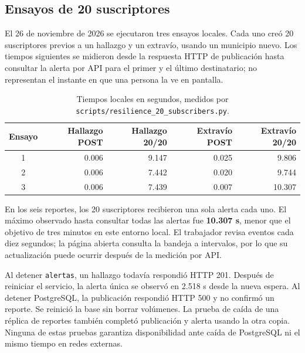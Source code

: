 \subsection*{Ensayos de 20 suscriptores}
El 26 de noviembre de 2026 se ejecutaron tres ensayos locales. Cada uno creó 20 suscriptores previos a un hallazgo y un extravío, usando un municipio nuevo. Los tiempos siguientes se midieron desde la respuesta HTTP de publicación hasta consultar la alerta por API para el primer y el último destinatario; no representan el instante en que una persona la ve en pantalla.
\begin{table}[H]\centering\small
\caption{Tiempos locales en segundos, medidos por \texttt{scripts/resilience\_20\_subscribers.py}.}
\begin{tabular}{@{}crrrr@{}}\toprule
Ensayo & Hallazgo POST & Hallazgo 20/20 & Extravío POST & Extravío 20/20 \\\midrule
1 & 0.006 & 9.147 & 0.025 & 9.806 \\
2 & 0.006 & 7.442 & 0.020 & 9.744 \\
3 & 0.006 & 7.439 & 0.007 & 10.307 \\\bottomrule
\end{tabular}
\end{table}
En los seis reportes, los 20 suscriptores recibieron una sola alerta cada uno. El máximo observado hasta consultar todas las alertas fue \textbf{10.307 s}, menor que el objetivo de tres minutos en este entorno local. El trabajador revisa eventos cada diez segundos; la página abierta consulta la bandeja a intervalos, por lo que su actualización puede ocurrir después de la medición por API.

Al detener \texttt{alertas}, un hallazgo todavía respondió HTTP 201. Después de reiniciar el servicio, la alerta única se observó en 2.518 s desde la nueva espera. Al detener PostgreSQL, la publicación respondió HTTP 500 y no confirmó un reporte. Se reinició la base sin borrar volúmenes. La prueba de caída de una réplica de reportes también completó publicación y alerta usando la otra copia. Ninguna de estas pruebas garantiza disponibilidad ante caída de PostgreSQL ni el mismo tiempo en redes externas.
